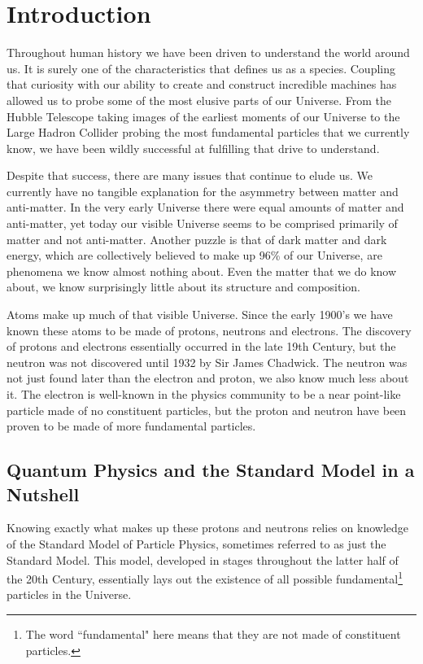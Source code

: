 \chapter{Introduction}
\label{ch:introduction}
Throughout human history we have been driven to understand the world around us. It is surely one of the characteristics that defines us as a species. Coupling that curiosity with our ability to create and construct incredible machines has allowed us to probe some of the most elusive parts of our Universe. From the Hubble Telescope taking images of the earliest moments of our Universe to the Large Hadron Collider probing the most fundamental particles that we currently know, we have been wildly successful at fulfilling that drive to understand.

Despite that success, there are many issues that continue to elude us. We currently have no tangible explanation for the asymmetry between matter and anti-matter. In the very early Universe there were equal amounts of matter and anti-matter, yet today our visible Universe seems to be comprised primarily of matter and not anti-matter. Another puzzle is that of dark matter and dark energy, which are collectively believed to make up 96\% of our Universe, are phenomena we know almost nothing about. Even the matter that we do know about, we know surprisingly little about its structure and composition.

Atoms make up much of that visible Universe. Since the early 1900's we have known these atoms to be made of protons, neutrons and electrons. The discovery of protons and electrons essentially occurred in the late 19th Century, but the neutron was not discovered until 1932 by Sir James Chadwick. The neutron was not just found later than the electron and proton, we also know much less about it. The electron is well-known in the physics community to be a near point-like particle made of no constituent particles, but the proton and neutron have been proven to be made of more fundamental particles.

\section{Quantum Physics and the Standard Model in a Nutshell}
Knowing exactly what makes up these protons and neutrons relies on knowledge of the Standard Model of Particle Physics, sometimes referred to as just the Standard Model. This model, developed in stages throughout the latter half of the 20th Century, essentially lays out the existence of all possible fundamental\footnote{The word ``fundamental" here means that they are not made of constituent particles.} particles in the Universe.

